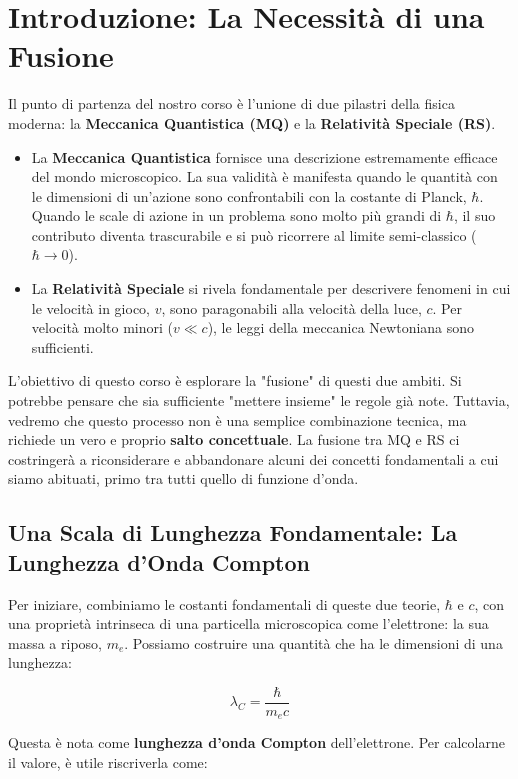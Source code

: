 
\section{Introduzione: La Necessità di una Fusione}

Il punto di partenza del nostro corso è l'unione di due pilastri della fisica moderna: la \textbf{Meccanica Quantistica (MQ)} e la \textbf{Relatività Speciale (RS)}.

\begin{itemize}
    \item La \textbf{Meccanica Quantistica} fornisce una descrizione estremamente efficace del mondo microscopico. La sua validità è manifesta quando le quantità con le dimensioni di un'azione sono confrontabili con la costante di Planck, $\hbar$. Quando le scale di azione in un problema sono molto più grandi di $\hbar$, il suo contributo diventa trascurabile e si può ricorrere al limite semi-classico ($\hbar \to 0$).
    
    \item La \textbf{Relatività Speciale} si rivela fondamentale per descrivere fenomeni in cui le velocità in gioco, $v$, sono paragonabili alla velocità della luce, $c$. Per velocità molto minori ($v \ll c$), le leggi della meccanica Newtoniana sono sufficienti.
\end{itemize}

L'obiettivo di questo corso è esplorare la "fusione" di questi due ambiti. Si potrebbe pensare che sia sufficiente "mettere insieme" le regole già note. Tuttavia, vedremo che questo processo non è una semplice combinazione tecnica, ma richiede un vero e proprio \textbf{salto concettuale}. La fusione tra MQ e RS ci costringerà a riconsiderare e abbandonare alcuni dei concetti fondamentali a cui siamo abituati, primo tra tutti quello di funzione d'onda.

\subsection{Una Scala di Lunghezza Fondamentale: La Lunghezza d'Onda Compton}

Per iniziare, combiniamo le costanti fondamentali di queste due teorie, $\hbar$ e $c$, con una proprietà intrinseca di una particella microscopica come l'elettrone: la sua massa a riposo, $m_e$. Possiamo costruire una quantità che ha le dimensioni di una lunghezza:

$$
\lambda_C = \frac{\hbar}{m_e c}
$$

Questa è nota come \textbf{lunghezza d'onda Compton} dell'elettrone. Per calcolarne il valore, è utile riscriverla come:

